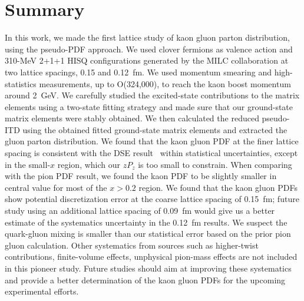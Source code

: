 \section{Summary}\label{sec:summary}
In this work, we made the first lattice study of kaon gluon parton distribution, using the pseudo-PDF approach.
We used clover fermions as valence action and 310-MeV 2+1+1 HISQ configurations generated by the MILC collaboration at two lattice spacings, 0.15 and 0.12~fm.
We used momentum smearing and high-statistics measurements, up to O(324,000), to reach the kaon boost momentum around 2~GeV.
We carefully studied the excited-state contributions to the matrix elements using a two-state fitting strategy and made sure that our ground-state matrix elements were stably obtained.
We then calculated the reduced pseudo-ITD using the obtained fitted ground-state matrix elements and extracted the gluon parton distribution.
We found that the kaon gluon PDF at the finer lattice spacing is consistent with the DSE  result~\cite{Cui:2020tdf} within statistical uncertainties, except in the small-$x$ region, which our $z P_z$ is too small to constrain.
When comparing with the pion PDF result, we found the kaon PDF to be slightly smaller in central value for most of the $x > 0.2$ region.
We found that the kaon gluon PDFs show potential discretization error at the coarse lattice spacing of 0.15~fm;
future study using an additional lattice spacing of 0.09~fm would give us a better estimate of the systematics uncertainty in the 0.12~fm results.
We suspect the quark-gluon mixing is smaller than our statistical error based on the prior pion gluon calculation.
Other systematics from sources such as higher-twist contributions, finite-volume effects, unphysical pion-mass effects are not included in this pioneer study.
Future studies should aim at improving these systematics and provide a better determination of the kaon gluon PDFs for the upcoming experimental efforts.
